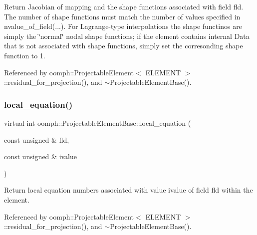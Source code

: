 Return Jacobian of mapping and the shape functions associated with field fld. The number of shape functions must match the number of values specified in nvalue\+\_\+of\+\_\+field(...). For Lagrange-\/type interpolations the shape functinos are simply the \char`\"{}normal\char`\"{} nodal shape functions; if the element contains internal Data that is not associated with shape functions, simply set the corresonding shape function to 1. 



Referenced by oomph\+::\+Projectable\+Element$<$ E\+L\+E\+M\+E\+N\+T $>$\+::residual\+\_\+for\+\_\+projection(), and $\sim$\+Projectable\+Element\+Base().

\mbox{\label{classoomph_1_1ProjectableElementBase_ac5c27ae929ff636dc7747fe23fd4f738}} 
\subsubsection{\texorpdfstring{local\+\_\+equation()}{local\_equation()}}
{\footnotesize\ttfamily virtual int oomph\+::\+Projectable\+Element\+Base\+::local\+\_\+equation (\begin{DoxyParamCaption}\item[{const unsigned \&}]{fld,  }\item[{const unsigned \&}]{ivalue }\end{DoxyParamCaption})\hspace{0.3cm}{\ttfamily [pure virtual]}}



Return local equation numbers associated with value ivalue of field fld within the element. 



Referenced by oomph\+::\+Projectable\+Element$<$ E\+L\+E\+M\+E\+N\+T $>$\+::residual\+\_\+for\+\_\+projection(), and $\sim$\+Projectable\+Element\+Base().

\mbox{\label{classoomph_1_1ProjectableElementBase_a44634aa4049332a580d249c25564638c}} 
